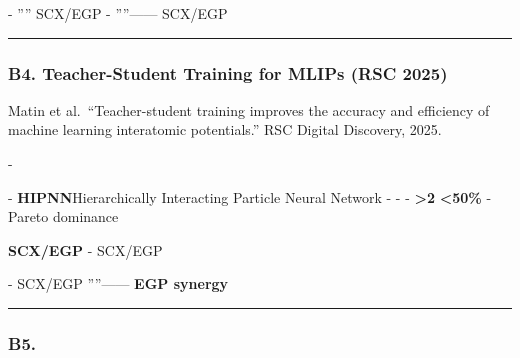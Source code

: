 \documentclass[
  12pt,
]{article}
\begin{document}
\textbf{} - '''' SCX/EGP
 -
''''------ SCX/EGP


\begin{center}\rule{0.5\linewidth}{0.5pt}\end{center}

\subsubsection{B4. Teacher-Student Training for MLIPs (RSC
2025)}\label{b4.-teacher-student-training-for-mlips-rsc-2025}

\textbf{} Matin et al.~``Teacher-student training improves the
accuracy and efficiency of machine learning interatomic potentials.''
RSC Digital Discovery, 2025.

\textbf{}
-\textbf{}

\textbf{} - \textbf{HIPNN}Hierarchically Interacting
Particle Neural Network -
 -
 - 
\textbf{\textgreater2 }\textbf{\textless50\%
}\textbf{} - \textbf{}Pareto
dominance

\textbf{ SCX/EGP } - \textbf{}
\textbf{}SCX/EGP


\textbf{} - SCX/EGP
''''------
\textbf{EGP synergy}

\begin{center}\rule{0.5\linewidth}{0.5pt}\end{center}

\subsubsection{B5.
}\label{b5.-ux5176ux4ed6ux91cdux8981ux84b8ux998fux5de5ux4f5c}
\end{document}
